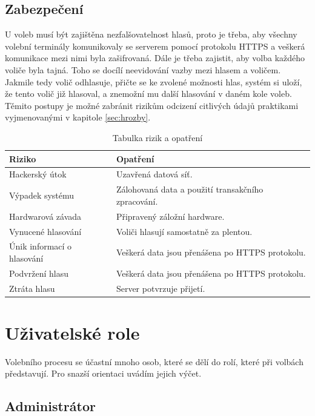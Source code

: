 \documentclass[11pt,twoside,a4paper]{book}
\begin{document}
\subsection{Zabezpečení}

U voleb musí být zajištěna nezfalšovatelnost hlasů, proto je třeba, aby všechny volební terminály komunikovaly se serverem pomocí protokolu HTTPS a veškerá komunikace mezi nimi byla zašifrovaná. Dále je třeba zajistit, aby volba každého voliče byla tajná. Toho se docílí neevidování vazby mezi hlasem a voličem. Jakmile tedy volič odhlasuje, přičte se ke zvolené možnosti hlas, systém si uloží, že tento volič již hlasoval, a znemožní mu další hlasování v daném kole voleb. Těmito postupy je možné zabránit rizikům odcizení citlivých údajů praktikami vyjmenovanými v kapitole \ref{sec:hrozby}.

\begin{table}[h!]
	\begin{center}	
		\begin{tabular}{|l|l|}
		\hline		
		\textbf{Riziko} & \textbf{Opatření} \\
		\hline
		Hackerský útok & Uzavřená datová síť. \\
		\hline		
		Výpadek systému & Zálohovaná data a použití transakčního zpracování. \\
		\hline
		Hardwarová závada & Připravený záložní hardware. \\
		\hline
		Vynucené hlasování & Voliči hlasují samostatně za plentou. \\
		\hline
		Únik informací o hlasování & Veškerá data jsou přenášena po HTTPS protokolu. \\
		\hline		
		Podvržení hlasu & Veškerá data jsou přenášena po HTTPS protokolu. \\
		\hline
		Ztráta hlasu & Server potvrzuje přijetí. \\
		\hline
		\end{tabular}		
	\end{center}
	\caption{Tabulka rizik a opatření}
	\label{tab:rizika}
\end{table}

\section{Uživatelské role}

Volebního procesu se účastní mnoho osob, které se dělí do rolí, které při volbách představují. Pro snazší orientaci uvádím jejich výčet.

\subsection{Administrátor}
\end{document}
